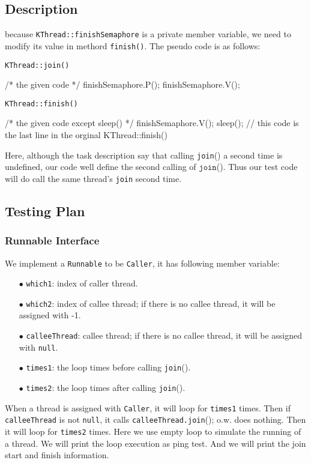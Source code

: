 \documentclass{article}
\begin{document}
\begin{spacing}{1.1}
\subsection{Description}
because \texttt{KThread::finishSemaphore} is a private
member variable, we need to modify its value in methord \texttt{finish()}.
The pseudo code is as follows:
\begin{algorithm}[htbp]
  \caption{\texttt{KThread::join()}}
  \begin{algorithmic}[1]
    \State /* the given code */
    \State finishSemaphore.P();
    \State finishSemaphore.V();
  \end{algorithmic}
\end{algorithm}

\begin{algorithm}[htbp]
  \caption{\texttt{KThread::finish()}}
  \begin{algorithmic}[1]
    \State /* the given code except sleep() */
    \State finishSemaphore.V();
    \State sleep(); // this code is the last line in the orginal KThread::finish()
  \end{algorithmic}
\end{algorithm}
{\color{red}Here, although the task description say that calling \texttt{join}() a second time is undefined, 
our code well define the second calling of $\texttt{join}$(). Thus our test code will do call the same thread's
\texttt{join} second time.}

\subsection{Testing Plan}
\subsubsection{Runnable Interface}
We implement a \texttt{Runnable} to be \texttt{Caller}, it has following member variable:
\begin{enumerate}
  \item[$\bullet$] \texttt{which1}: index of caller thread.
  \item[$\bullet$] \texttt{which2}: index of callee thread; if there is no callee thread,
    it will be assigned with -1.
  \item[$\bullet$] \texttt{calleeThread}: callee thread; if there is no callee thread, it 
    will be assigned with \texttt{null}.
  \item[$\bullet$] \texttt{times1}: the loop times before calling \texttt{join}().
  \item[$\bullet$] \texttt{times2}: the loop times after calling \texttt{join}().
\end{enumerate}
When a thread is assigned with \texttt{Caller}, it will loop for \texttt{times1} times. Then if
\texttt{calleeThread} is not \texttt{null}, it calls \texttt{calleeThread.join}(); o.w. does nothing.
Then it will loop for \texttt{times2} times. Here we use empty loop to simulate the running of a thread.
We will print the loop execution as ping test. And we will print the join start and finish information.

\end{spacing}
\end{document}
